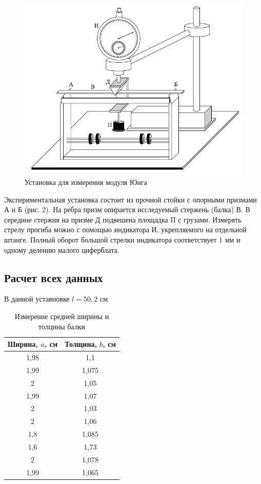 \documentclass[a4paper]{article}
\begin{document}
\begin{figure}[!ht]
    \centering
    \includegraphics[scale=0.8]{balka.png}
    \caption{Установка для измерения модуля Юнга}
\end{figure}

Экспериментальная установка состоит из прочной стойки с опорными призмами А и Б (рис. 2). На ребра призм опирается исследуемый
стержень (балка) В. В середине стержня на призме Д подвешена площадка П с грузами. Измерять стрелу прогиба можно с помощью индикатора И, укрепляемого на отдельной штанге. Полный оборот большой стрелки индикатора соответствует 1 мм и одному делению малого циферблата.

\newpage
\subsection{Расчет всех данных}

В данной уставновке $l = 50,2$ см

\begin{table}[h!]
\begin{center}
\begin{tabular}{|c|c|}
\hline
Ширина, $a$, см & Толщина, $b$, см \\ \hline
1,98       & 1,1         \\ \hline
1,99       & 1,075       \\ \hline
2          & 1,05        \\ \hline
1,99       & 1,07        \\ \hline
2          & 1,03        \\ \hline
2          & 1,06        \\ \hline
1,8        & 1,085       \\ \hline
1,6        & 1,73        \\ \hline
2          & 1,078       \\ \hline
1,99       & 1,065       \\ \hline
\end{tabular}
\caption{Измерение средней ширины и толцины балки}
\end{center}
\end{table}
\end{document}
